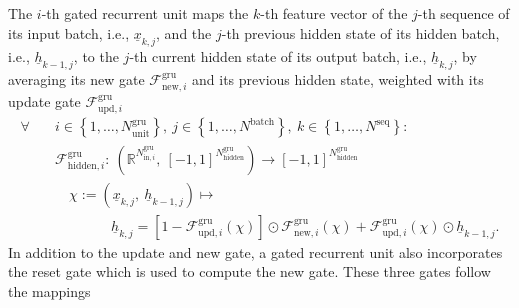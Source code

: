 The $i$-th gated recurrent unit 
maps the $k$-th feature vector of
the $j$-th sequence 
of its input batch, i.e.,
$\underline x_{k,j}$,
and the $j$-th previous hidden state
of its hidden batch,
i.e., $\underline h_{k-1,j}$,
to the $j$-th current hidden state of its output batch,
i.e., $\underline h_{k,j}$,
by averaging
its new gate 
$\mathcal{F}^\text{gru}_{\text{new},i}$
and its previous hidden state,
weighted with its update gate
$\mathcal{F}^\text{gru}_{\text{upd},i}$
\begin{align} \label{eq:gru_hidden}
    \forall \quad &
    i \in \left\{
        1, \dots, N^\text{gru}_\text{unit}
    \right\}
    ,\ 
    j \in \left\{
        1, \dots, N^\text{batch}
    \right\}
    ,\ 
    k \in \left\{
        1, \dots, N^\text{seq}
    \right\}
    :
    \nonumber \\ &
    \mathcal{F}^\text{gru}_{\text{hidden},i}
    :\
    \left(
        \mathbb{R}^{
            N^\text{gru}_{\text{in}, i}
        }
        ,\ 
        \left[
            -1, 1
        \right]^{
            N^\text{gru}_{\text{hidden}}
        }
    \right)
    \rightarrow 
    \left[
        -1, 1
    \right]^{
        N^\text{gru}_{\text{hidden}}
    }
    \nonumber \\ & \quad
    \chi
    :=
    \left(
        \underline x_{k,j}
        ,\ 
        \underline h_{k-1,j}
    \right)
    \mapsto
    \nonumber \\ & \qquad \qquad
    \underline h_{k,j}
    =
    \left[
        1 
        -
        \mathcal{F}^\text{gru}_{\text{upd},i} \left(
            \chi
        \right)
    \right]
    \odot
    \mathcal{F}^\text{gru}_{\text{new},i} \left(
        \chi
    \right)
    +
    \mathcal{F}^\text{gru}_{\text{upd},i} \left(
        \chi
    \right)
    \odot
    \underline h_{k-1,j}
    .
\end{align}
In addition to the update and new gate,
a gated recurrent unit also incorporates
the reset gate which is used to compute the new gate.
These three gates
follow the mappings
